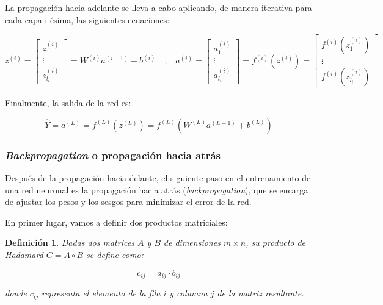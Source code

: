 \documentclass[12pt,twoside]{article}
\newtheorem{definition}[theorem]{Definición}
\begin{document}
La propagación hacia adelante se lleva a cabo aplicando, de manera iterativa para cada capa i-ésima, las siguientes ecuaciones:

\begin{equation}
z^{(i)} =
\begin{bmatrix}
z_1^{(i)} \\
\vdots \\
z_{l_i}^{(i)}
\end{bmatrix}
=
W^{(i)} a^{(i-1)} + b^{(i)}
\quad \text{;} \quad
a^{(i)} = 
\begin{bmatrix}
a_1^{(i)} \\
\vdots \\
a_{l_i}^{(i)}
\end{bmatrix}
=
f^{(i)}(z^{(i)})
=
\begin{bmatrix}
f^{(i)}(z_1^{(i)}) \\
\vdots \\
f^{(i)}(z_{l_i}^{(i)})
\end{bmatrix}
\end{equation}

Finalmente, la salida de la red es:

\begin{equation}
\hat{Y}=a^{(L)}= f^{(L)}(z^{(L)}) = f^{(L)}(W^{(L)}a^{(L-1)} + b^{(L)})
\end{equation}

\subsubsection{\textit{Backpropagation} o propagación hacia atrás}\label{sec:13}

Después de la propagación hacia delante, el siguiente paso en el entrenamiento de una red neuronal es la propagación hacia atrás (\textit{backpropagation}), que se encarga de ajustar los pesos y los sesgos para minimizar el error de la red.

En primer lugar, vamos a definir dos productos matriciales:

\begin{definition} Dadas dos matrices $A$ y $B$ de dimensiones $m \times n$, su producto de Hadamard $C = A \circ B$ se define como:

\begin{equation}
c_{ij} = a_{ij} \cdot b_{ij}
\end{equation}

donde \(c_{ij}\) representa el elemento de la fila \(i\) y columna \(j\) de la matriz resultante.
\end{definition}
\end{document}
